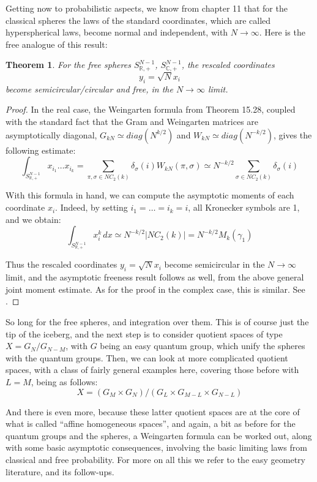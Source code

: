 \documentclass[12pt]{amsbook}
\newtheorem{theorem}{Theorem}[chapter]
\begin{document}
Getting now to probabilistic aspects, we know from chapter 11 that for the classical spheres the laws of the standard coordinates, which are called hyperspherical laws, become normal and independent, with $N\to\infty$. Here is the free analogue of this result:

\begin{theorem}
For the free spheres $S^{N-1}_{\mathbb R,+}$, $S^{N-1}_{\mathbb C,+}$, the rescaled coordinates 
$$y_i=\sqrt{N}x_i$$
become semicircular/circular and free, in the $N\to\infty$ limit.
\end{theorem}

\begin{proof}
In the real case, the Weingarten formula from Theorem 15.28, coupled with the standard fact that the Gram and Weingarten matrices are asymptotically diagonal, $G_{kN}\simeq diag(N^{k/2})$ and $W_{kN}\simeq diag(N^{-k/2})$, gives the following estimate:
$$\int_{S^{N-1}_{\mathbb R,+}}x_{i_1}\ldots x_{i_k}
=\sum_{\pi,\sigma\in NC_2(k)}\delta_\sigma(i)W_{kN}(\pi,\sigma)
\simeq N^{-k/2}\sum_{\sigma\in NC_2(k)}\delta_\sigma(i)$$

With this formula in hand, we can compute the asymptotic moments of each coordinate $x_i$. Indeed, by setting $i_1=\ldots=i_k=i$, all Kronecker symbols are 1, and we obtain:
$$\int_{S^{N-1}_{\mathbb R,+}}x_i^k\,dx\simeq N^{-k/2}|NC_2(k)|=N^{-k/2}M_k(\gamma_1)$$

Thus the rescaled coordinates $y_i=\sqrt{N}x_i$ become semicircular in the $N\to\infty$ limit, and the asymptotic freeness result follows as well, from the above general joint moment estimate. As for the proof in the complex case, this is similar. See \cite{bgo}.
\end{proof}

So long for the free spheres, and integration over them. This is of course just the tip of the iceberg, and the next step is to consider quotient spaces of type $X=G_N/G_{N-M}$, with $G$ being an easy quantum group, which unify the spheres with the quantum groups. Then, we can look at more complicated quotient spaces, with a class of fairly general examples here, covering those before with $L=M$, being as follows:
$$X=(G_M\times G_N)\big/(G_L\times G_{M-L}\times G_{N-L})$$

And there is even more, because these latter quotient spaces are at the core of what is called ``affine homogeneous spaces'', and again, a bit as before for the quantum groups and the spheres, a Weingarten formula can be worked out, along with some basic asymptotic consequences, involving the basic limiting laws from classical and free probability. For more on all this we refer to the easy geometry literature, \cite{bgo} and its follow-ups.
 
\end{document}
